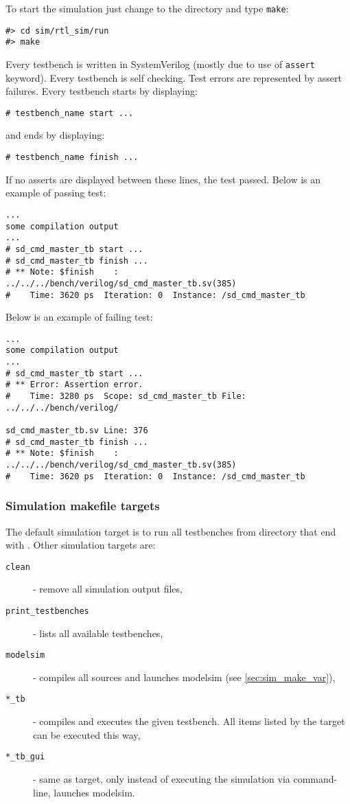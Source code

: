     To start the simulation just change to the  directory and type \texttt{make}:
    \begin{verbatim}
#> cd sim/rtl_sim/run
#> make
    \end{verbatim}
    
    Every testbench is written in SystemVerilog (mostly due to use of \texttt{assert} keyword). Every testbench is self checking. Test errors are represented by
    assert failures. Every testbench starts by displaying: 
    \begin{verbatim}
# testbench_name start ...
    \end{verbatim} 
    and ends by displaying:
    \begin{verbatim}
# testbench_name finish ...
    \end{verbatim} 
    If no asserts are displayed between these lines, the test passed. Below is an example of passing test:
    \begin{verbatim}
... 
some compilation output
...
# sd_cmd_master_tb start ...
# sd_cmd_master_tb finish ...
# ** Note: $finish    : ../../../bench/verilog/sd_cmd_master_tb.sv(385)
#    Time: 3620 ps  Iteration: 0  Instance: /sd_cmd_master_tb
    \end{verbatim}
    Below is an example of failing test:
    \begin{verbatim}
... 
some compilation output
...
# sd_cmd_master_tb start ...
# ** Error: Assertion error.
#    Time: 3280 ps  Scope: sd_cmd_master_tb File: ../../../bench/verilog/
                                                    sd_cmd_master_tb.sv Line: 376
# sd_cmd_master_tb finish ...
# ** Note: $finish    : ../../../bench/verilog/sd_cmd_master_tb.sv(385)
#    Time: 3620 ps  Iteration: 0  Instance: /sd_cmd_master_tb
    \end{verbatim}
    
    \subsubsection{Simulation makefile targets}
    \label{sec:sim_make_targ}

    The default simulation target is to run all testbenches from  directory that end with . Other simulation targets are:
    \begin{description}
    \item[\texttt{clean}] - remove all simulation output files,
    \item[\texttt{print\_testbenches}] - lists all available testbenches,
    \item[\texttt{modelsim}] - compiles all sources and launches modelsim (see \ref{sec:sim_make_var}),
    \item[\texttt{*\_tb}] - compiles and executes the given testbench. All items listed by the  target can be executed this way,
    \item[\texttt{*\_tb\_gui}] - same as  target, only instead of executing the simulation via command-line, launches modelsim.
    \end{description}
    
